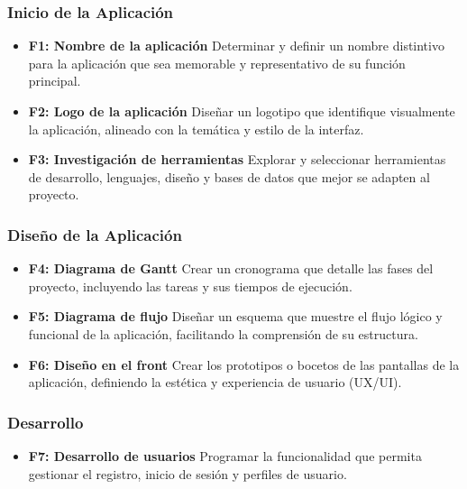 \documentclass{article}
\begin{document}
\begin{flushleft}
\clearpage

\subsubsection{Inicio de la Aplicaci\'on}
\begin{itemize}
    \item \textbf{F1: Nombre de la aplicaci\'on}  
    Determinar y definir un nombre distintivo para la aplicaci\'on que sea memorable y representativo de su funci\'on principal.
    
    \item \textbf{F2: Logo de la aplicaci\'on}  
    Dise\~nar un logotipo que identifique visualmente la aplicaci\'on, alineado con la tem\'atica y estilo de la interfaz.
    
    \item \textbf{F3: Investigaci\'on de herramientas}  
    Explorar y seleccionar herramientas de desarrollo, lenguajes, dise\~no y bases de datos que mejor se adapten al proyecto.
\end{itemize}

\subsubsection{Dise\~no de la Aplicaci\'on}
\begin{itemize}
    \item \textbf{F4: Diagrama de Gantt}  
    Crear un cronograma que detalle las fases del proyecto, incluyendo las tareas y sus tiempos de ejecuci\'on.
    
    \item \textbf{F5: Diagrama de flujo}  
    Dise\~nar un esquema que muestre el flujo l\'ogico y funcional de la aplicaci\'on, facilitando la comprensi\'on de su estructura.
    
    \item \textbf{F6: Dise\~no en el front}  
    Crear los prototipos o bocetos de las pantallas de la aplicaci\'on, definiendo la est\'etica y experiencia de usuario (UX/UI).
\end{itemize}

\subsubsection{Desarrollo}
\begin{itemize}
    \item \textbf{F7: Desarrollo de usuarios}  
    Programar la funcionalidad que permita gestionar el registro, inicio de sesi\'on y perfiles de usuario.
    

\end{itemize}
\end{flushleft}
\end{document}
